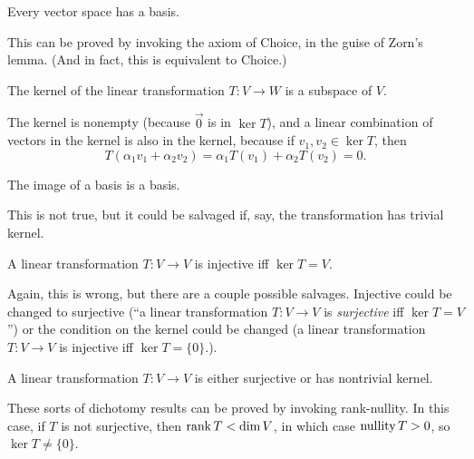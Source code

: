 \documentclass{homework}
\begin{document}
\begin{problem}
  Every vector space has a basis.
\end{problem}

\begin{solution}
  This can be proved by invoking the axiom of Choice, in the guise of
  Zorn's lemma.  (And in fact, this is equivalent to Choice.)
\end{solution}

\begin{problem}
  The kernel of the linear transformation $T : V \to W$ is a subspace of $V$.
\end{problem}

\begin{solution}
  The kernel is nonempty (because $\vec{0}$ is in $\ker T$), and a
  linear combination of vectors in the kernel is also in the kernel,
  because if $v_1, v_2 \in \ker T$, then
  \[
    T(\alpha_1 v_1 + \alpha_2 v_2) = \alpha_1 T(v_1) + \alpha_2 T(v_2) = 0.
  \]
\end{solution}

\begin{problem}
  The image of a basis is a basis.
\end{problem}

\begin{solution}
  This is not true, but it could be salvaged if, say, the
  transformation has trivial kernel.
\end{solution}

\begin{problem} %
  A linear transformation $T : V \to V$ is injective iff $\ker T = V$.
\end{problem}

\begin{solution}
  Again, this is wrong, but there are a couple possible salvages.  Injective could be changed to surjective (``a linear transformation $T : V \to V$ is \textit{surjective} iff $\ker T = V$'') or the condition on the kernel could be changed (a linear transformation $T : V \to V$ is injective iff $\ker T = \{ 0 \}$.).
\end{solution}

\begin{problem}
  A linear transformation $T : V \to V$ is either surjective or has nontrivial kernel.
\end{problem}

\begin{solution}
  These sorts of dichotomy results can be proved by invoking rank-nullity.  In this case, if $T$ is not surjective, then $\operatorname{rank} T < \dim V$, in which case $\operatorname{nullity} T > 0$, so $\ker T \neq \{ 0 \}$.
\end{solution}
\end{document}

